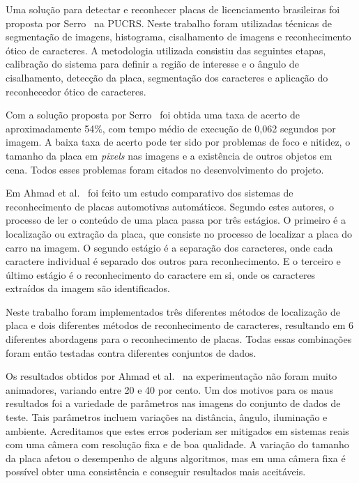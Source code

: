 Uma solução para detectar e reconhecer placas de licenciamento brasileiras foi
proposta por Serro~\cite{serro2012deteccao} na PUCRS\@. Neste trabalho foram
utilizadas técnicas de segmentação de imagens, histograma, cisalhamento de
imagens e reconhecimento ótico de caracteres. A metodologia utilizada consistiu das
seguintes etapas, calibração do sistema
para definir a região de interesse e o ângulo de cisalhamento, detecção da
placa, segmentação dos caracteres e aplicação do reconhecedor ótico de
caracteres.

Com a solução proposta por Serro~\cite{serro2012deteccao}  foi obtida uma taxa de
acerto de aproximadamente 54\%, com tempo médio de execução de 0,062 segundos por imagem.
A baixa taxa de acerto pode ter sido por problemas de foco e nitidez, o tamanho da placa em
\emph{pixels} nas imagens e a existência de outros objetos em cena. Todos esses
problemas foram citados no desenvolvimento do projeto.

Em Ahmad et al.~\cite{ahmad2015automatic} foi feito um estudo comparativo dos
sistemas de reconhecimento de placas automotivas automáticos. Segundo estes
autores, o processo de ler o conteúdo de uma placa passa por três estágios. O
primeiro é a localização ou extração da placa, que consiste no processo de
localizar a placa do carro na imagem. O segundo estágio é a separação dos
caracteres, onde cada caractere individual é separado dos outros para
reconhecimento. E o terceiro e último estágio é o reconhecimento do caractere em
si, onde os caracteres extraídos da imagem são identificados.

Neste trabalho foram implementados três diferentes métodos de localização de
placa e dois diferentes métodos de reconhecimento de caracteres, resultando em 6
diferentes abordagens para o reconhecimento de placas. Todas essas combinações
foram então testadas contra diferentes conjuntos de dados.

Os resultados obtidos por Ahmad et al.~\cite{ahmad2015automatic} na experimentação não
foram muito animadores, variando entre 20 e 40 por cento.
Um dos motivos para os maus resultados foi a variedade de parâmetros nas imagens do conjunto
de dados de teste. Tais parâmetros incluem
variações na distância, ângulo, iluminação e ambiente. Acreditamos que estes erros poderiam ser
mitigados em sistemas reais com uma câmera com resolução fixa e de boa
qualidade. A variação do tamanho da placa afetou o desempenho de alguns
algoritmos, mas em uma câmera fixa é possível obter uma consistência e conseguir
resultados mais aceitáveis.

